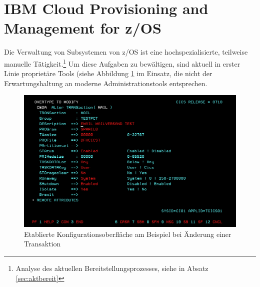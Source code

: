 \section{\glqq IBM Cloud Provisioning and Management for z/OS\grqq}\label{sec:tool}
Die Verwaltung von Subsystemen von z/OS ist eine hochspezialisierte, teilweise manuelle Tätigkeit.\footnote{Analyse des aktuellen Bereitstellungsprozesses, siehe in Absatz \ref{sec:aktbereit}}
Um diese Aufgaben zu bewältigen, sind aktuell in erster Linie proprietäre Tools (siehe Abbildung \ref{fig:configalt} im Einsatz, die nicht der Erwartungshaltung an moderne Administrationstools entsprechen.

\begin{figure}[h]
\centering
\includegraphics[width=\textwidth]{figures/Transaktionbearbeitenalt.PNG}
\caption{Etablierte Konfigurationsoberfläche am Beispiel bei Änderung einer Transaktion}
\label{fig:configalt}
\end{figure}

